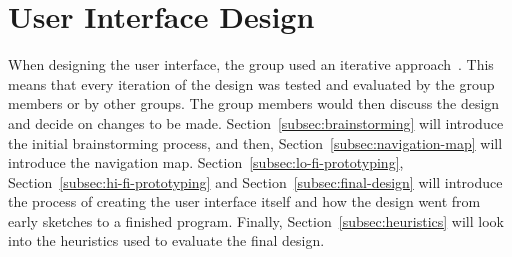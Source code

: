 \section{User Interface Design}\label{sec:user-interface-design}

When designing the user interface, the group used an iterative approach~\cite{iterative-design}.
This means that every iteration of the design was tested and evaluated by the group members or by other groups.
The group members would then discuss the design and decide on changes to be made.
Section~\ref{subsec:brainstorming} will introduce the initial brainstorming process, and then, 
Section~\ref{subsec:navigation-map} will introduce the navigation map.
Section~\ref{subsec:lo-fi-prototyping}, Section~\ref{subsec:hi-fi-prototyping} and Section~\ref{subsec:final-design}
will introduce the process of creating the user interface itself and how the design went from early sketches to a
finished program.
Finally, Section~\ref{subsec:heuristics} will look into the heuristics used to evaluate the final design.







